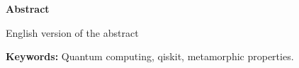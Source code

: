 \newpage

\thispagestyle{empty}

\begin{center}

{\bf \Huge Abstract}

  \end{center}
\vspace{1cm}

English version of the abstract

\vspace{1cm}

\textbf{Keywords:} Quantum computing, qiskit, metamorphic properties.